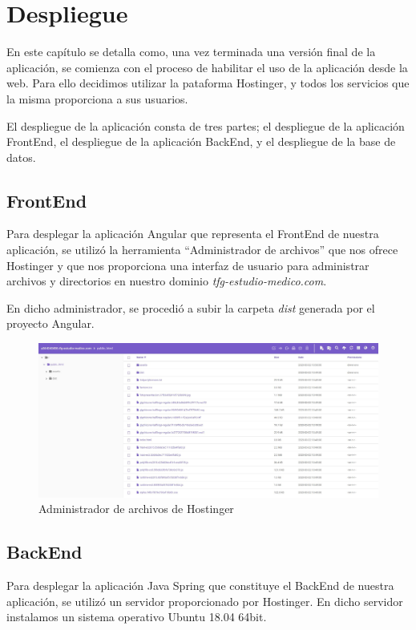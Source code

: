 \chapter{Despliegue}
    En este capítulo se detalla como, una vez terminada una versión final de la aplicación, se comienza con el proceso de habilitar el uso de la aplicación desde la web. Para ello decidimos utilizar la pataforma Hostinger\cite{hostinger}, y todos los servicios que la misma proporciona a sus usuarios.
    \newline
    
    El despliegue de la aplicación consta de tres partes; el despliegue de la aplicación FrontEnd, el despliegue de la aplicación BackEnd, y el despliegue de la base de datos.
    
    \section{FrontEnd}
    Para desplegar la aplicación Angular que representa el FrontEnd de nuestra aplicación, se utilizó la herramienta ``Administrador de archivos'' que nos ofrece Hostinger y que nos proporciona una interfaz de usuario para administrar archivos y directorios en nuestro dominio \textit{tfg-estudio-medico.com}.
    \newline
    
    En dicho administrador, se procedió a subir la carpeta \textit{dist} generada por el proyecto Angular.
    
     \begin{figure}[h]
    \centering
     \includegraphics[width=1\textwidth]{images/administradorarchivos}
    \caption{Administrador de archivos de Hostinger}
    \end{figure}
    

    \section{BackEnd}
    Para desplegar la aplicación Java Spring que constituye el BackEnd de nuestra aplicación, se utilizó un servidor proporcionado por Hostinger\cite{hostinger}. En dicho servidor instalamos un sistema operativo Ubuntu 18.04 64bit.
    

